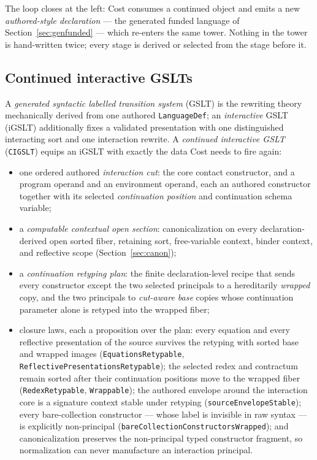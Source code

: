 \documentclass[11pt]{article}
\newcommand{\code}[1]{\texttt{#1}}
\begin{document}
\noindent
The loop closes at the left: Cost consumes a continued object and emits a
new \emph{authored-style declaration} --- the generated funded language of
Section~\ref{sec:genfunded} --- which re-enters the same tower.  Nothing
in the tower is hand-written twice; every stage is derived or selected
from the stage before it.

\subsection{Continued interactive GSLTs}

A \emph{generated syntactic labelled transition system} (GSLT) is the
rewriting theory mechanically derived from one authored
\code{LanguageDef}; an \emph{interactive} GSLT (iGSLT) additionally fixes
a validated presentation with one distinguished interacting sort and one
interaction rewrite.  A \emph{continued interactive GSLT} (\code{CIGSLT})
equips an iGSLT with exactly the data Cost needs to fire again:

\begin{itemize}
\item one ordered authored \emph{interaction cut}: the core contact
  constructor, and a program operand and an environment operand, each an
  authored constructor together with its selected \emph{continuation
  position} and continuation schema variable;
\item a \emph{computable contextual open section}: canonicalization on
  every declaration-derived open sorted fiber, retaining sort,
  free-variable context, binder context, and reflective scope
  (Section~\ref{sec:canon});
\item a \emph{continuation retyping plan}: the finite declaration-level
  recipe that sends every constructor except the two selected principals
  to a hereditarily \emph{wrapped} copy, and the two principals to
  \emph{cut-aware base} copies whose continuation parameter alone is
  retyped into the wrapped fiber;
\item closure laws, each a proposition over the plan: every equation and
  every reflective presentation of the source survives the retyping with
  sorted base and wrapped images (\code{EquationsRetypable},
  \code{ReflectivePresentationsRetypable}); the selected redex and
  contractum remain sorted after their continuation positions move to the
  wrapped fiber (\code{RedexRetypable}, \code{Wrappable}); the authored
  envelope around the interaction core is a signature context stable
  under retyping (\code{sourceEnvelopeStable}); every bare-collection
  constructor --- whose label is invisible in raw syntax --- is
  explicitly non-principal (\code{bareCollectionConstructorsWrapped});
  and canonicalization preserves the non-principal typed constructor
  fragment, so normalization can never manufacture an interaction
  principal.
\end{itemize}
\end{document}
